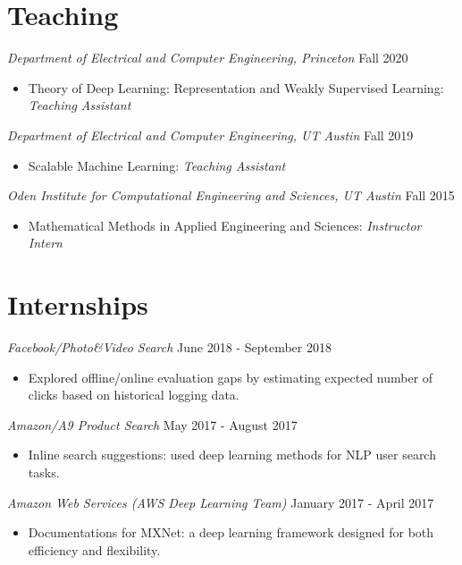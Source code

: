 \documentclass[margin, 10pt]{res} %
\begin{document}
\begin{resume}
\section{Teaching}
{\sl Department of Electrical and Computer Engineering, Princeton} \hfill Fall 2020
\begin{itemize}
	\item Theory of Deep Learning: Representation and Weakly Supervised Learning: {\sl Teaching Assistant}
\end{itemize}


{\sl Department of Electrical and Computer Engineering, UT Austin} \hfill Fall 2019
\begin{itemize}
  \item Scalable Machine Learning: {\sl Teaching Assistant}
  \end{itemize}

{\sl Oden Institute for Computational Engineering and Sciences, UT Austin} \hfill Fall 2015
\begin{itemize}
  \item Mathematical Methods in Applied Engineering and Sciences: {\sl Instructor Intern}
\end{itemize}


\section{Internships}

{\sl Facebook/Photo\&Video Search} \hfill June 2018 - September 2018

\begin{itemize}
	\item  Explored offline/online evaluation gaps by estimating expected number of clicks based on historical logging data.
\end{itemize}

{\sl Amazon/A9 Product Search} \hfill May 2017 - August 2017
\begin{itemize}
	\item Inline search suggestions: used deep learning methods for NLP user search tasks.
\end{itemize}

{\sl Amazon Web Services (AWS Deep Learning Team)} \hfill January 2017 - April 2017
\begin{itemize}
	\item Documentations for MXNet: a deep learning framework designed for 
	both efficiency and flexibility.
\end{itemize}


\end{resume}
\end{document}
